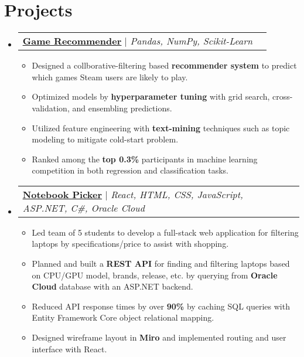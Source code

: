\documentclass[letterpaper, 10pt]{article}
\makeatletter
\newcommand{\resumeItem}[1]{
  \item\small{
    {#1 \vspace{-2pt}}
  }
}
\newcommand{\resumeProjectHeading}[2]{
    \vspace{4pt}\item
    \begin{tabular*}{0.97\textwidth}{l@{\extracolsep{\fill}}r}
      \small#1 & #2 \\
    \end{tabular*}\vspace{-7pt}
}
\newcommand{\resumeSubHeadingListStart}{\begin{itemize}[leftmargin=0.15in, label={}]}
\newcommand{\resumeSubHeadingListEnd}{\end{itemize}}
\newcommand{\resumeItemListStart}{\begin{itemize}}
\newcommand{\resumeItemListEnd}{\end{itemize}\vspace{-4pt}}
\makeatother
\begin{document}
\section{Projects}
    \resumeSubHeadingListStart
      \resumeProjectHeading
          {\href{}{\underline{\textbf{Game Recommender}}} $|$ \emph{Pandas, NumPy, Scikit-Learn}}{}
          \resumeItemListStart
            \resumeItem{Designed a collborative-filtering based \textbf{recommender system} to predict which games Steam users are likely to play. }
            \resumeItem{Optimized models by \textbf{hyperparameter tuning} with grid search, cross-validation, and ensembling predictions. }
            \resumeItem{Utilized feature engineering with \textbf{text-mining} techniques such as topic modeling to mitigate cold-start problem.}
            \resumeItem{Ranked among the \textbf{top 0.3\%} participants in machine learning competition in both regression and classification tasks.}
          \resumeItemListEnd
      \resumeProjectHeading
          {\href{https://github.com/benjxia/notebookpicker}{\underline{\textbf{Notebook Picker}}} $|$ \emph{React, HTML, CSS, JavaScript, ASP.NET, C\#, Oracle Cloud}}{}
          \resumeItemListStart
            \resumeItem{Led team of 5 students to develop a full-stack web application for filtering laptops by specifications/price to assist with shopping.}
            \resumeItem{Planned and built a \textbf{REST API} for finding and filtering laptops based on CPU/GPU model, brands, release, etc. by querying from \textbf{Oracle Cloud} database with an ASP.NET backend.}
            \resumeItem{Reduced API response times by over \textbf{90\%} by caching SQL queries with Entity Framework Core object relational mapping.}
            \resumeItem{Designed wireframe layout in \textbf{Miro} and implemented routing and user interface with React.}
          \resumeItemListEnd
    \resumeSubHeadingListEnd



\end{document}
